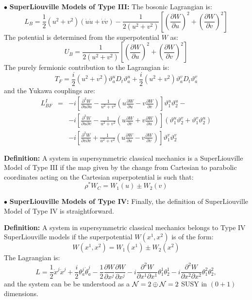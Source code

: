 \documentclass[a4paper,11pt,twoside]{article}
\begin{document}
\noindent $\bullet$ {\bf SuperLiouville Models of Type III:} The
bosonic Lagrangian is:
\[
L_B= \displaystyle\frac{1}{2}
(u^2+v^2) \left( \dot{u} \dot{u}+ \dot{v} \dot{v}  \right) -
\displaystyle\frac{1}{2 (u^2+v^2)} \left[ \left(
\displaystyle\frac{\partial W}{\partial u} \right)^2+ \left(
\displaystyle\frac{\partial W}{\partial v} \right)^2 \right]
\]
The potential is determined from the superpotential $W$ as:
\[
U_{B}= \displaystyle\frac{1}{2 (u^2+v^2)} \left[ \left( \displaystyle\frac{\partial W}{\partial u} \right)^2+
\left( \displaystyle\frac{\partial W}{\partial v} \right)^2 \right]
\]
The purely fermionic contribution to the Lagrangian is:
\[
T_F=\frac{i}{2} (u^2+v^2) \vartheta_a^u D_t
\vartheta_a^u+ \frac{i}{2} (u^2+v^2) \vartheta_a^v D_t \vartheta_a^v
\]
and the Yukawa couplings are:
\begin{eqnarray*}
{L}_{BF}^I&=& -i \left[ \frac{\partial^2 W}{\partial u \partial u} -\displaystyle\frac{1}{u^2+v^2} \left(u \frac{\partial W}{\partial u} -v \frac{\partial W}{\partial v} \right) \right] \vartheta_1^u \vartheta_2^u- \\ & & -i \left[ \frac{\partial^2 W}{\partial u \partial v} - \displaystyle\frac{1}{u^2+v^2} \left( u \frac{\partial W}{\partial v} +v \frac{\partial W}{\partial u} \right) \right] (\vartheta_1^u \vartheta_2^v+\vartheta_1^v \vartheta_2^u) \\
& & -i \left[ \frac{\partial^2 W}{\partial v \partial v} +\displaystyle\frac{1}{u^2+v^2} \left( u \frac{\partial W}{\partial u} -v \frac{\partial W}{\partial v} \right) \right] \vartheta_1^v \vartheta_2^v
\end{eqnarray*}

{\bf Definition:} A system in supersymmetric classical mechanics
is a  SuperLiouville Model of Type III if the map given by the
change from Cartesian to parabolic coordinates acting on the
Cartesian superpotential is such that:
\[
\rho^{*} W_C= W_1(u)\pm W_2(v)
\]

\vspace*{0.1cm}

\noindent $\bullet$ {\bf SuperLiouville Models of Type IV:}
Finally, the definition of SuperLiouville Model of Type IV is
straightforward.

{\bf Definition:} A system in supersymmetric classical mechanics
belongs to Type IV SuperLiouville models if the superpotential
$W(x^1,x^2)$ is of the form:
\[
W(x^1,x^2)=W_1(x^1)\pm W_2(x^2)
\]
The Lagrangian is:
\[
L = \displaystyle\frac{1}{2} \dot{x}^j \dot{x}^j
+\displaystyle\frac{i}{2} \theta_a^j \dot{\theta}_a^j
-\displaystyle\frac{1}{2} \displaystyle\frac{\partial W}{\partial
x^j} \displaystyle\frac{\partial W}{\partial x^j}-i
\displaystyle\frac{\partial^2 W}{\partial x^1 \partial x^1}
\theta_1^1 \theta_2^1-i \displaystyle\frac{\partial^2 W}{\partial
x^2 \partial x^2} \theta_1^2 \theta_2^2 ,
\]
and the system can be be understood as a ${\cal N}=2 \oplus {\cal
N}=2$ SUSY in $(0+1)$ dimensions.
\end{document}
